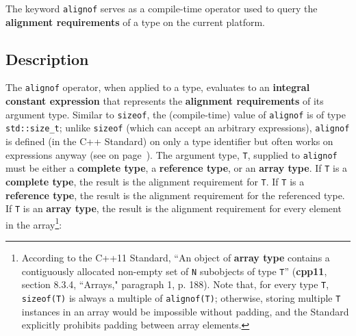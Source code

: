 

\setcounter{table}{0}
\setcounter{footnote}{0}
\setcounter{lstlisting}{0}

The keyword \texttt{alignof} serves as a compile-time operator used to
query the \textbf{alignment requirements} of a type on the current
platform.

\subsection[Description]{Description}\label{description}

The \texttt{alignof} operator, when applied to a type, evaluates to an
\textbf{integral constant expression} that represents the
\textbf{alignment requirements} of its argument type. Similar to
\texttt{sizeof}, the (compile-time) value of \texttt{alignof} is of type
\texttt{std::size\_t}; unlike \texttt{sizeof} (which can accept an
arbitrary expressions), \texttt{alignof} is defined (in the C++
Standard) on only a type identifier but often works on expressions
anyway (see \textit{} on page~\pageref{annoyances-alignof}). The argument type,
\texttt{T}, supplied to \texttt{alignof} must be either a
\textbf{complete type}, a \textbf{reference type}, or an \textbf{array
type}. If \texttt{T} is a \textbf{complete type}, the result is the
alignment requirement for \texttt{T}. If \texttt{T} is a
\textbf{reference type}, the result is the alignment requirement for the
referenced type. If \texttt{T} is an \textbf{array type}, the
result is the alignment requirement for every element in the array{\cprotect\footnote{According to the C++11 Standard, ``An object of \textbf{array type} contains a contiguously allocated
  non-empty set of \texttt{N} subobjects of type \texttt{T}''  (\textbf{cpp11}, section 8.3.4, ``Arrays," paragraph 1, p. 188). Note
  that, for every type \texttt{T}, \texttt{sizeof(T)} is always a
  multiple of \texttt{alignof(T)}; otherwise, storing multiple \texttt{T} instances in an array would be impossible without padding,
  and the Standard explicitly prohibits padding between array elements.}}:

